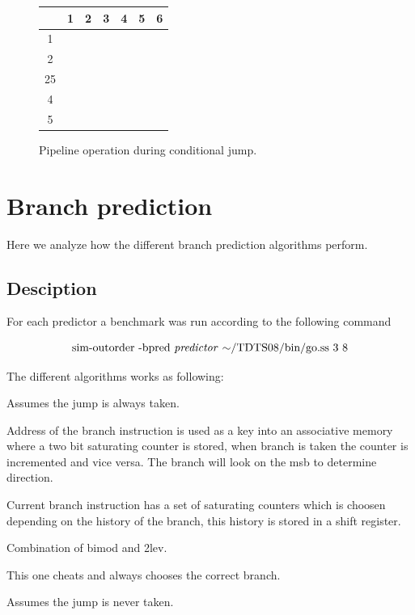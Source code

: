 \documentclass[titlepage, a4paper]{article}
\begin{document}
\begin{figure}[H]
  \centering
  \begin{tabular}{|c|c|c|c|c|c|c|}
    \hline
        {} & {1} & {2} & {3} & {4} & {5} & {6} \\ \hline
        {1} & \cellcolor{blue!25}{IF} & \cellcolor{orange!25}{EX} & {} & {} & {} & {} \\ \hline
        {2} & {} & \cellcolor{blue!25}{IF} & \cellcolor{orange!25}{EX} & {} & {} & {} \\ \hline
        {25} & {} & {} & \cellcolor{blue!25}{IF} & {} & {} & {} \\ \hline
        {4} & {} & {} & {} & \cellcolor{blue!25}{IF} & \cellcolor{orange!25}{EX} & {} \\ \hline
        {5} & {} & {} & {} & {} & \cellcolor{blue!25}{IF} & \cellcolor{orange!25}{EX} \\ \hline
  \end{tabular}
  \caption{Pipeline operation during conditional jump.}
  \label{fig:condjmp_pipe_op}
\end{figure}

\section{Branch prediction}
Here we analyze how the different branch prediction algorithms perform.

\subsection{Desciption}
For each predictor a benchmark was run according to the following command

$$\text{sim-outorder -bpred \textit{predictor} $\mathtt{\sim}$/TDTS08/bin/go.ss 3 8}$$

The different algorithms works as following:

\begin{description}[leftmargin=!,labelwidth=\widthof{\bfseries NOTTAKEN}]

\item[TAKEN] Assumes the jump is always taken.
\item[BIMOD] Address of the branch instruction is used as a key into an associative memory where a two bit saturating counter is stored, when branch is taken the counter is incremented and vice versa. The branch will look on the msb to determine direction.
\item[2LEV] Current branch instruction has a set of saturating counters which is choosen depending on the history of the branch, this history is stored in a shift register.
\item[COMB] Combination of bimod and 2lev.
\item[PERFECT] This one cheats and always chooses the correct branch.
\item[NOTTAKEN] Assumes the jump is never taken.
\end{description}
~\newline
\end{document}
